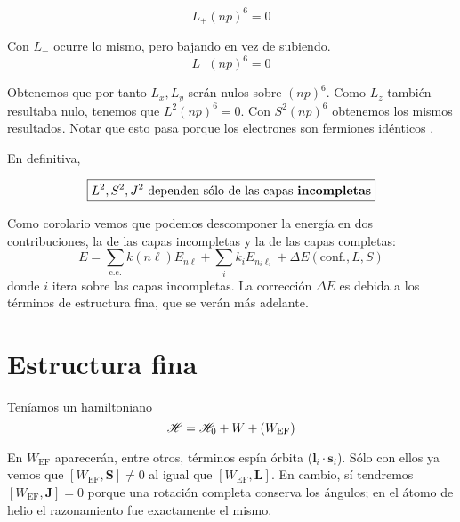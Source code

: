 \begin{equation}
  L_+ (np)^6 = 0
\end{equation}

Con $L_-$ ocurre lo mismo, pero bajando en vez de subiendo.
\begin{equation}
  L_- (np)^6 = 0
\end{equation}

Obtenemos que por tanto $L_x, L_y$ serán nulos sobre $(np)^6$. Como $L_z$ también
resultaba nulo, tenemos que $L^2(np)^6=0$. Con $S^2(np)^6$ obtenemos los mismos resultados.
Notar que esto pasa porque los electrones son fermiones idénticos
.

En definitiva,

\begin{equation*}
  \boxed{
    L^2,S^2,J^2 \text{ dependen sólo de las capas \textbf{incompletas}}
  }
\end{equation*}

Como corolario vemos que podemos descomponer la energía en dos
contribuciones, la de las capas incompletas y la de las capas
completas:
\begin{equation}
  E = \sum_{\text{c.c.}} k(n\ell) E_{n\ell} + \sum_{i} k_i
  E_{n_i\ell_i} + \Delta E(\text{conf.},L,S)
\end{equation}
donde $i$ itera sobre las capas incompletas. La corrección $\Delta E$
es debida a los términos de estructura fina, que se verán más adelante.

\section{Estructura fina}
Teníamos un hamiltoniano
\begin{equation}
  \mathscr{H} = \mathscr{H}_0 + W + (W_\text{EF})
\end{equation}

En $W_\text{EF}$ aparecerán, entre otros, términos espín órbita ($\mathbf{l}_i\cdot \mathbf{s}_i$).
Sólo con ellos ya vemos
que $[W_\text{EF},\mathbf{S}]\neq 0$ al igual que
$[W_\text{EF},\mathbf{L}]$. En cambio, sí tendremos
$[W_\text{EF},\mathbf{J}]=0$ porque una rotación completa conserva los
ángulos; en el átomo de helio el razonamiento fue exactamente el mismo.

